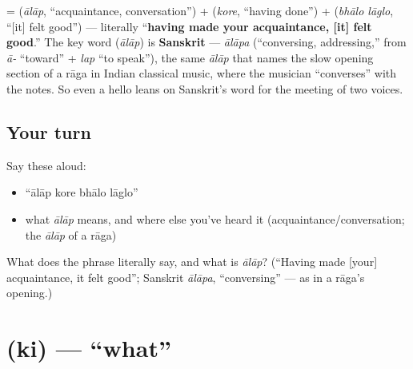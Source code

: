 \begin{cousinweb}
\textbf{   } = \textbf{} (\emph{ālāp}, \textquotedblleft{}acquaintance, conversation\textquotedblright{}) + \textbf{} (\emph{kore}, \textquotedblleft{}having done\textquotedblright{}) + \textbf{ } (\emph{bhālo lāglo}, \textquotedblleft{}{[}it{]} felt good\textquotedblright{}) — literally \textquotedblleft{}\textbf{having made your acquaintance, {[}it{]} felt good}.\textquotedblright{} The key word \textbf{} (\emph{ālāp}) is \textbf{Sanskrit} — \emph{ālāpa} (\textquotedblleft{}conversing, addressing,\textquotedblright{} from \emph{ā-} \textquotedblleft{}toward\textquotedblright{} + \emph{lap} \textquotedblleft{}to speak\textquotedblright{}), the same \emph{ālāp} that names the slow opening section of a rāga in Indian classical music, where the musician \textquotedblleft{}converses\textquotedblright{} with the notes. So even a hello leans on Sanskrit's word for the meeting of two voices.
\end{cousinweb}

\subsection*{Your turn}
Say these aloud:

\begin{itemize}
\raggedright
  \item \textquotedblleft{}ālāp kore bhālo lāglo\textquotedblright{}
  \item what \emph{ālāp} means, and where else you've heard it (acquaintance/conversation; the \emph{ālāp} of a rāga)
\end{itemize}

\begin{tcolorbox}[breakable,colback=teal!4,colframe=teal!35!black,title={Before you move on}]
What does the phrase literally say, and what is \emph{ālāp}? (\textquotedblleft{}Having made {[}your{]} acquaintance, it felt good\textquotedblright{}; Sanskrit \emph{ālāpa}, \textquotedblleft{}conversing\textquotedblright{} — as in a rāga's opening.)
\end{tcolorbox}
\section[\bn{কি}]{ (ki) — \textquotedblleft{}what\textquotedblright{}}

\label{lesson:BN-C02-ki}




